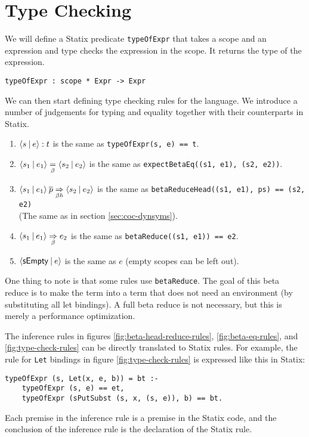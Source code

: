 \section{Type Checking}
\label{sec:coc-typecheck}

We will define a Statix predicate \verb|typeOfExpr| that takes a scope and an expression and type checks the expression in the scope. It returns the type of the expression.

\begin{lstlisting}
typeOfExpr : scope * Expr -> Expr
\end{lstlisting}
We can then start defining type checking rules for the language. We introduce a number of judgements for typing and equality together with their counterparts in Statix.
\begin{enumerate}
	\item $\langle s \: | \: e\rangle : t$ is the same as \verb|typeOfExpr(s, e) == t|.
	\item $\langle s_1 \: | \: e_1\rangle \underset{\beta}{=} \langle s_2 \: | \: e_2\rangle$ is the same as \verb|expectBetaEq((s1, e1), (s2, e2))|.
	\item $\langle s_1 \: | \: e_1\rangle \: \overline{p} \underset{\beta h}{\Rightarrow} \langle s_2 \: | \: e_2\rangle$ is the same as \verb|betaReduceHead((s1, e1), ps) == (s2, e2)| \\ (The same as in section \ref{sec:coc-dynsyms}).
	\item $\langle s_1 \: | \: e_1\rangle \underset{\beta}{\Rightarrow} e_2$ is the same as \verb|betaReduce((s1, e1)) == e2|.
	\item $\langle\mathsf{sEmpty} \: | \: e\rangle$ is the same as $e$ (empty scopes can be left out).
\end{enumerate}

One thing to note is that some rules use \verb|betaReduce|. The goal of this beta reduce is to make the term into a term that does not need an environment (by substituting all let bindings). A full beta reduce is not necessary, but this is merely a performance optimization.

The inference rules in figures \ref{fig:beta-head-reduce-rules}, \ref{fig:beta-eq-rules}, and \ref{fig:type-check-rules} can be directly translated to Statix rules. For example, the rule for \verb|Let| bindings in figure \ref{fig:type-check-rules} is expressed like this in Statix:
\begin{lstlisting}
typeOfExpr (s, Let(x, e, b)) = bt :-
	typeOfExpr (s, e) == et, 
	typeOfExpr (sPutSubst (s, x, (s, e)), b) == bt.
\end{lstlisting}

Each premise in the inference rule is a premise in the Statix code, and the conclusion of the inference rule is the declaration of the Statix rule. 

